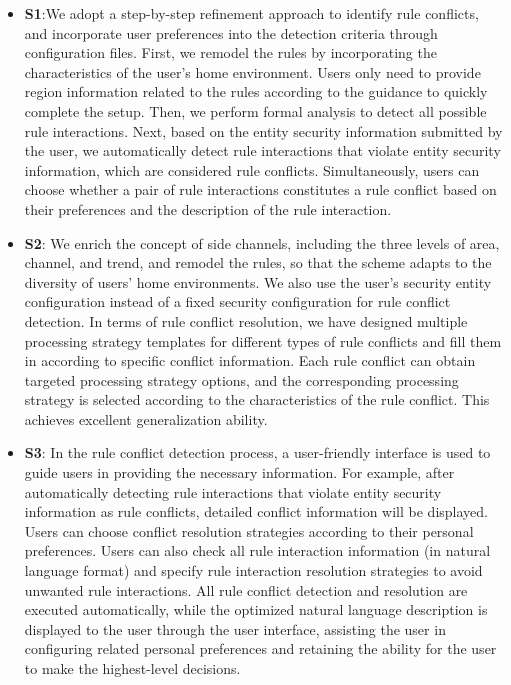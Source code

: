 \begin{itemize}
	\item \textbf{S1}:We adopt a step-by-step refinement approach to identify rule conflicts, and incorporate user preferences into the detection criteria through configuration files. First, we remodel the rules by incorporating the characteristics of the user's home environment. Users only need to provide region information related to the rules according to the guidance to quickly complete the setup. Then, we perform formal analysis to detect all possible rule interactions. Next, based on the entity security information submitted by the user, we automatically detect rule interactions that violate entity security information, which are considered rule conflicts. Simultaneously, users can choose whether a pair of rule interactions constitutes a rule conflict based on their preferences and the description of the rule interaction.
	
	\item \textbf{S2}: We enrich the concept of side channels, including the three levels of area, channel, and trend, and remodel the rules, so that the scheme adapts to the diversity of users' home environments. We also use the user's security entity configuration instead of a fixed security configuration for rule conflict detection. In terms of rule conflict resolution, we have designed multiple processing strategy templates for different types of rule conflicts and fill them in according to specific conflict information. Each rule conflict can obtain targeted processing strategy options, and the corresponding processing strategy is selected according to the characteristics of the rule conflict. This achieves excellent generalization ability.
	
	\item \textbf{S3}: In the rule conflict detection process, a user-friendly interface is used to guide users in providing the necessary information. For example, after automatically detecting rule interactions that violate entity security information as rule conflicts, detailed conflict information will be displayed. Users can choose conflict resolution strategies according to their personal preferences. Users can also check all rule interaction information (in natural language format) and specify rule interaction resolution strategies to avoid unwanted rule interactions. All rule conflict detection and resolution are executed automatically, while the optimized natural language description is displayed to the user through the user interface, assisting the user in configuring related personal preferences and retaining the ability for the user to make the highest-level decisions.
\end{itemize}